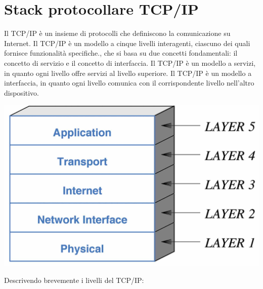 \documentclass[12pt]{report}
\begin{document}
	\section{Stack protocollare TCP/IP}
	Il TCP/IP è un insieme di protocolli che definiscono la comunicazione su Internet. Il TCP/IP è un modello a cinque livelli interagenti, ciascuno dei quali fornisce funzionalità specifiche., che si basa su due concetti fondamentali: il concetto di servizio e il concetto di interfaccia. Il TCP/IP è un modello a servizi, in quanto ogni livello offre servizi al livello superiore. Il TCP/IP è un modello a interfaccia, in quanto ogni livello comunica con il corrispondente livello nell'altro dispositivo.
	\begin{center}
		\includegraphics[scale=0.15]{assets/tcp-ip-stack.jpg}
	\end{center}
	Descrivendo brevemente i livelli del TCP/IP:
\end{document}

